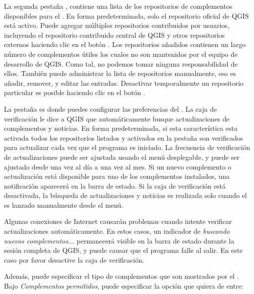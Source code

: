 
La segunda pestaña , contiene una lista de los repositorios de complementos disponibles para el . En forma predeterminada, solo el repositorio oficial de QGIS está activo. Puede agregar múltiples repositorios contribuidos por usuarios, incluyendo el repositorio contribuido central de QGIS y otros repositorios externos haciendo clic en el botón . Los repositorios añadidos contienen un largo número de complementos útiles los cuales no son mantenidos por el equipo de desarrollo de QGIS. Como tal, no podemos tomar ninguna responsabilidad de ellos. También puede administrar la lista de repositorios manualmente, eso es añadir, remover, y editar las entradas. Desactivar temporalmente un repositorio particular es posible haciendo clic en el botón .


La pestaña  es donde puedes configurar las preferencias del . La caja de verificación  le dice a QGIS que automáticamente busque actualizaciones de complementos y noticias. En forma predeterminada, si esta característica esta activada todos los repositorios listados y activados en la pestaña  son verificados para actualizar cada vez que el programa es iniciado. La frecuencia de verificación de actualizaciones puede ser ajustada usando el menú desplegable, y puede ser ajustado desde una vez al día a una vez al mes. Si un nuevo complemento o actualización está disponible para uno de los complementos instalados, una notificación aparecerá en la barra de estado. Si la caja de verificación está desactivada, la búsqueda de actualizaciones y noticias es realizada solo cuando el  es lanzado manualmente desde el menú.

Algunas conexiones de Internet causarán problemas cuando intente verificar actualizaciones automáticamente. En estos casos, un indicador de \textit{buscando nuevos complementos...} permanecerá visible en la barra de estado durante la sesión completa de QGIS, y puede causar que el programa falle al salir. En este caso por favor desactive la caja de verificación.

Además, puede especificar el tipo de complementos que son mostrados por el . Bajo \textit{Complementos permitidos}, puede especificar la opción que quiera de entre:

